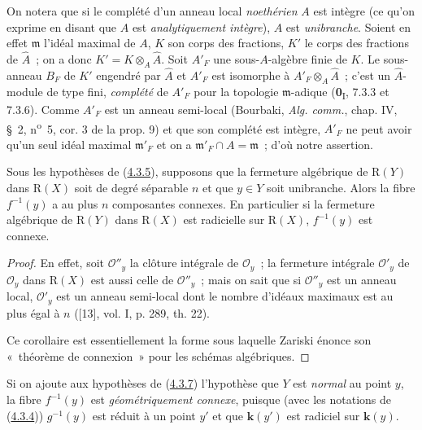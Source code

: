 On notera que si le complété d'un anneau local \emph{noethérien} $A$ est intègre
(ce qu'on exprime en disant que $A$ est \emph{analytiquement intègre}), $A$
est \emph{unibranche}. Soient en effet $\mathfrak m$ l'idéal maximal de $A$, $K$
son corps des fractions, $K'$ le corps des fractions de $\widehat A$~; on
a donc
$K'=K\otimes_A\widehat A$.
Soit $A'_F$ une sous-$A$-algèbre finie de $K$. Le sous-anneau $B_F$ de $K'$
engendré par $\widehat A$ et $A'_F$ est isomorphe à
$A'_F\otimes_A\widehat A$~; c'est un $\widehat A$-module de type fini,
\emph{complété} de $A'_F$ pour la topologie $\mathfrak m$-adique
(\textbf{0}\textsubscript{I}, 7.3.3 et 7.3.6). Comme $A'_F$ est un anneau semi-local
(Bourbaki, \emph{Alg. comm.}, chap. IV, \S~2, n\textsuperscript{o}~5,
cor. 3 de la prop. 9) et que son complété est intègre, $A'_F$ ne peut avoir
qu'un seul idéal maximal $\mathfrak m'_F$ et on a
$\mathfrak m'_F\cap A=\mathfrak m$~; d'où notre assertion.

\begin{corollary}[4.3.7]
\label{III.4.3.7-fr}
Sous les hypothèses de \textup{(\hyperref[III.4.3.5-fr]{4.3.5})}, supposons que la
fermeture algébrique de $\mathrm R(Y)$ dans $\mathrm R(X)$ soit de degré
séparable $n$ et que $y\in Y$ soit unibranche. Alors la fibre $f^{-1}(y)$ a
au plus $n$ composantes connexes. En particulier si la fermeture algébrique
de $\mathrm R(Y)$ dans $\mathrm R(X)$ est radicielle sur $\mathrm R(X)$,
$f^{-1}(y)$ est connexe.
\end{corollary}

\begin{proof}
En effet, soit $\mathcal O''_y$ la clôture intégrale de $\mathcal O_y$~; la
fermeture intégrale $\mathcal O'_y$ de $\mathcal O_y$ dans $\mathrm R(X)$
est aussi celle de $\mathcal O''_y$~; mais on sait que si $\mathcal O''_y$ est
un anneau local, $\mathcal O'_y$ est un anneau semi-local dont le nombre
d'idéaux maximaux est au plus égal à $n$ ([13], vol. I, p. 289, th. 22).

Ce corollaire est essentiellement la forme sous laquelle Zariski énonce son
«~théorème de connexion~» pour les schémas algébriques.
\end{proof}

\begin{remark}[4.3.8]
\label{III.4.3.8-fr}
Si on ajoute aux hypothèses de (\hyperref[III.4.3.7-fr]{4.3.7}) l'hypothèse
que $Y$ est \emph{normal} au point $y$, la fibre $f^{-1}(y)$ est
\emph{géométriquement connexe}, puisque (avec les notations de
(\hyperref[III.4.3.4-fr]{4.3.4})) $g^{-1}(y)$ est réduit à un point $y'$ et
que $\boldsymbol{k}(y')$ est radiciel sur $\boldsymbol{k}(y)$.
\end{remark}

